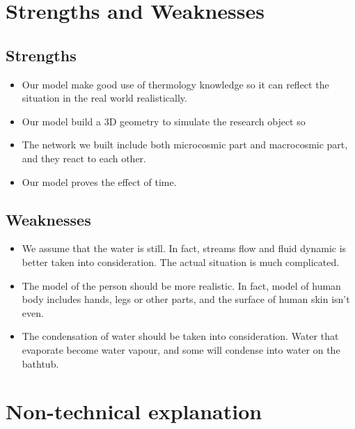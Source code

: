 \documentclass[12pt,a4paper,titlepage]{article}
\begin{document}
\section{Strengths and Weaknesses}
\label{sec:strengths-and-weaknesses}

\subsection*{Strengths}
\label{sec:strengths}

\begin{itemize}
\item Our model make good use of thermology knowledge so it can reflect the situation in the real world realistically.
\item Our model build a 3D geometry to simulate the research object so 
\item The network we built include both microcosmic part and
  macrocosmic part, and they react to each other.
\item Our model proves the effect of time.
\end{itemize}

\subsection*{Weaknesses}
\label{sec:weaknesses}

\begin{itemize}
\item We assume that the water is still. In fact, streams flow and fluid dynamic is better taken into consideration. The actual situation is much complicated.
\item The model of the person should be more realistic. In fact, model of human body includes hands, legs or other parts, and the surface of human skin isn't even.
\item The condensation of water should be taken into consideration. Water that evaporate become water vapour, and some will condense into water on the bathtub.
\end{itemize}


\begin{thebibliography}{99}

\bibitem{}

\end{thebibliography}

\label{LastPage}

\section{Non-technical explanation}
\end{document}
